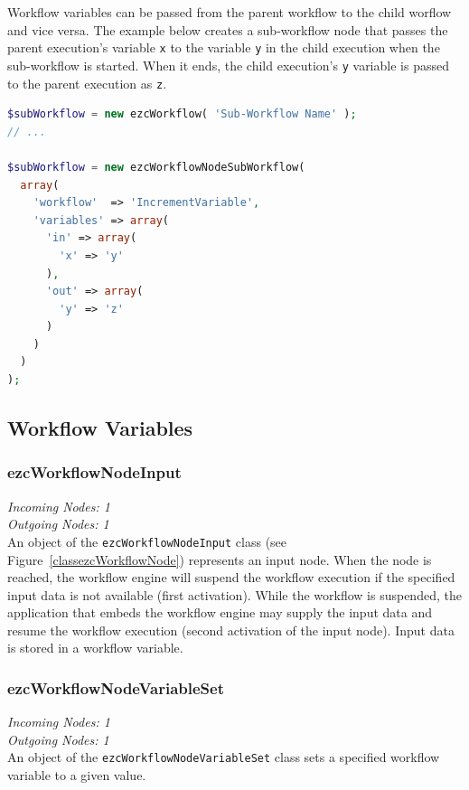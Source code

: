 Workflow variables can be passed from the parent workflow to the
child worflow and vice versa. The example below creates a sub-workflow
node that passes the parent execution's variable \texttt{x} to the variable
\texttt{y} in the child execution when the sub-workflow is started. When it
ends, the child execution's \texttt{y} variable is passed to the parent
execution as \texttt{z}.

\begin{lstlisting}[language=PHP]
$subWorkflow = new ezcWorkflow( 'Sub-Workflow Name' );
// ...

$subWorkflow = new ezcWorkflowNodeSubWorkflow(
  array(
    'workflow'  => 'IncrementVariable',
    'variables' => array(
      'in' => array(
        'x' => 'y'
      ),
      'out' => array(
        'y' => 'z'
      )
    )
  )
);
\end{lstlisting}

\subsection{Workflow Variables}

\subsubsection{ezcWorkflowNodeInput}

\emph{Incoming Nodes: 1}\\
\emph{Outgoing Nodes: 1}\\

An object of the \texttt{ezcWorkflowNodeInput} class (see
Figure~\ref{classezcWorkflowNode}) represents an input node. When the node is
reached, the workflow engine will suspend the workflow execution if the
specified input data is not available (first activation). While the workflow
is suspended, the application that embeds the workflow engine may supply the
input data and resume the workflow execution (second activation of the input
node). Input data is stored in a workflow variable.

\subsubsection{ezcWorkflowNodeVariableSet}

\emph{Incoming Nodes: 1}\\
\emph{Outgoing Nodes: 1}\\

An object of the \texttt{ezcWorkflowNodeVariableSet} class sets a specified
workflow variable to a given value.


